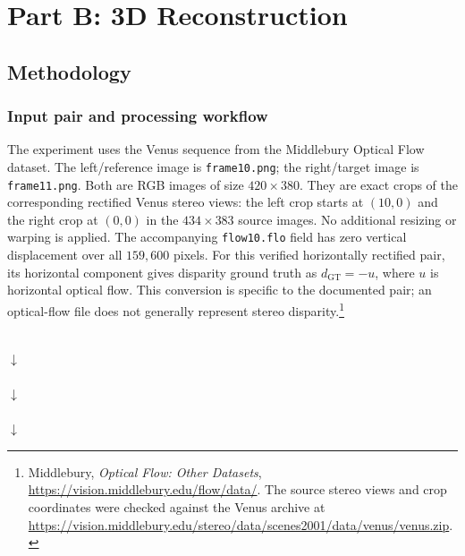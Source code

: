 \documentclass[a4paper,12pt]{article}
\begin{document}
\clearpage
\section{Part B: 3D Reconstruction}
\label{sec:part-b}
\subsection{Methodology}

\subsubsection{Input pair and processing workflow}
The experiment uses the Venus sequence from the Middlebury Optical Flow dataset. The left/reference image is \texttt{frame10.png}; the right/target image is \texttt{frame11.png}. Both are RGB images of size $420\times380$. They are exact crops of the corresponding rectified Venus stereo views: the left crop starts at $(10,0)$ and the right crop at $(0,0)$ in the $434\times383$ source images. No additional resizing or warping is applied. The accompanying \texttt{flow10.flo} field has zero vertical displacement over all $159{,}600$ pixels. For this verified horizontally rectified pair, its horizontal component gives disparity ground truth as $d_{\mathrm{GT}}=-u$, where $u$ is horizontal optical flow. This conversion is specific to the documented pair; an optical-flow file does not generally represent stereo disparity.\footnote{Middlebury, \emph{Optical Flow: Other Datasets}, \url{https://vision.middlebury.edu/flow/data/}. The source stereo views and crop coordinates were checked against the Venus archive at \url{https://vision.middlebury.edu/stereo/data/scenes2001/data/venus/venus.zip}.}

\begin{center}
\small
{}\\[3pt]
$\downarrow$\\[3pt]
\\[3pt]
$\downarrow$\\[3pt]
\\[3pt]
$\downarrow$\\[3pt]
\end{center}
\end{document}
